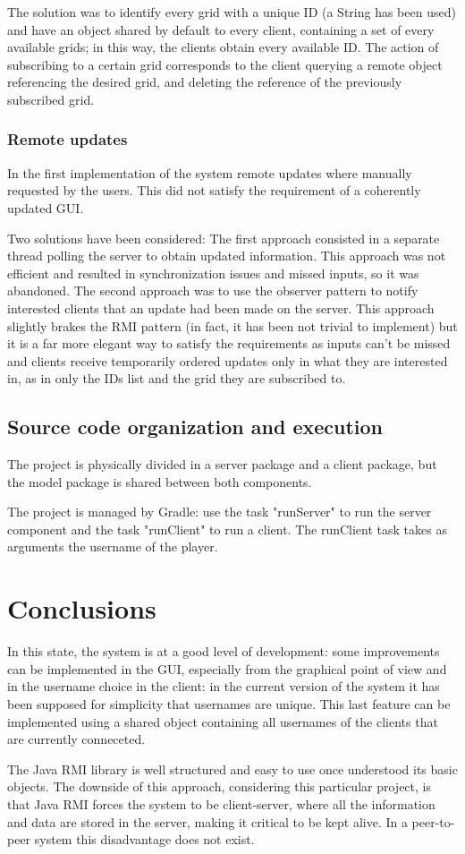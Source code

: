 \documentclass[12pt, a4paper]{report}
\begin{document}
The solution was to identify every grid with a unique ID (a String has been
 used) and have an object shared by default to every client, containing a set
 of every available grids; in this way, the clients obtain every available ID. The
 action of subscribing to a certain grid corresponds to the client querying a
 remote object referencing the desired grid, and deleting the reference of the
 previously subscribed grid.

\subsection{Remote updates}
In the first implementation of the system remote updates where manually
 requested by the users. This did not satisfy the requirement of a coherently
 updated GUI.

Two solutions have been considered:
The first approach consisted in a separate thread polling the server to obtain 
 updated information. This approach was not efficient and resulted in
 synchronization issues and missed inputs, so it was abandoned. The second
 approach was to use the observer pattern to notify interested clients that an
 update had been made on the server. This approach slightly brakes the RMI
 pattern (in fact, it has been not trivial to implement) but it is a far more
 elegant way to satisfy the requirements as inputs can't be missed and clients
 receive temporarily ordered updates only in what they are interested in, as in
 only the IDs list and the grid they are subscribed to.

\section{Source code organization and execution}
The project is physically divided in a server package and a client package, but
 the model package is shared between both components.

The project is managed by Gradle: use the task "runServer" to run the server
 component and the task "runClient" to run a client. The runClient task takes
 as arguments the username of the player.

\chapter{Conclusions}
In this state, the system is at a good level of development: some improvements
 can be implemented in the GUI, especially from the graphical point of view and
 in the username choice in the client: in the current version of the system it
 has been supposed for simplicity that usernames are unique. This last feature
 can be implemented using a shared object containing all usernames of the
 clients that are currently conneceted.

The Java RMI library is well structured and easy to use once understood its
 basic objects. The downside of this approach, considering this particular
 project, is that Java RMI forces the system to be client-server, where all the
 information and data are stored in the server, making it critical to be kept
 alive. In a peer-to-peer system this disadvantage does not exist.

% 
% 
\end{document}
